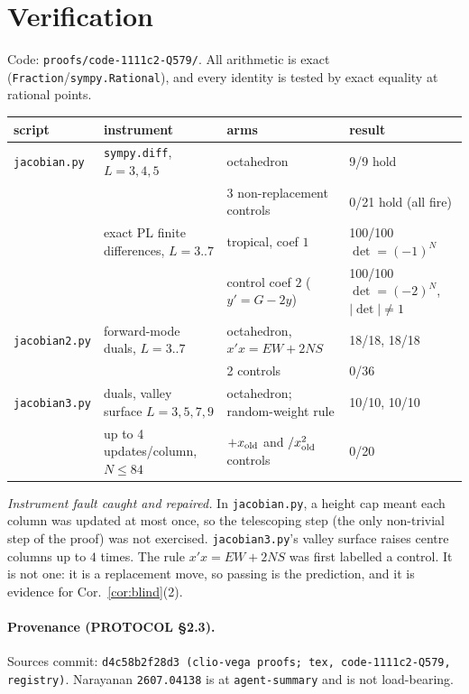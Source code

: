 \documentclass[11pt]{article}
\theoremstyle{definition}
\begin{document}
\section{Verification}\label{sec:ver}
Code: \texttt{proofs/code-1111c2-Q579/}. All arithmetic is exact (\texttt{Fraction}/\texttt{sympy.Rational}), and every identity is tested by exact
equality at rational points.
\begin{center}
\begin{tabular}{llll}
\toprule
script & instrument & arms & result\\
\midrule
\texttt{jacobian.py} & \texttt{sympy.diff}, $L=3,4,5$ & octahedron & 9/9 hold\\
& & 3 non-replacement controls & 0/21 hold (all fire)\\
& exact PL finite differences, $L=3..7$ & tropical, coef $1$ & 100/100 $\det=(-1)^N$\\
& & control coef $2$ ($y'=G-2y$) & 100/100 $\det=(-2)^N$, $|\det|\ne1$\\
\texttt{jacobian2.py} & forward-mode duals, $L=3..7$ & octahedron, $x'x=EW+2NS$ & 18/18, 18/18\\
& & 2 controls & 0/36\\
\texttt{jacobian3.py} & duals, valley surface $L=3,5,7,9$ & octahedron; random-weight rule & 10/10, 10/10\\
& up to 4 updates/column, $N\le84$ & $+x_{\rm old}$ and $/x_{\rm old}^2$ controls & 0/20\\
\bottomrule
\end{tabular}
\end{center}
\noindent\emph{Instrument fault caught and repaired.} In \texttt{jacobian.py}, a height cap meant each
column was updated at most once, so the telescoping step (the only non-trivial step of the proof)
was not exercised. \texttt{jacobian3.py}'s valley surface raises centre columns up to $4$ times. The
rule $x'x=EW+2NS$ was first labelled a control. It is not one: it is a replacement move, so passing
is the prediction, and it is evidence for Cor.~\ref{cor:blind}(2).

\paragraph{Provenance (PROTOCOL \S2.3).} Sources commit: \texttt{d4c58b2f28d3 (clio-vega proofs; tex, code-1111c2-Q579, registry)}.
Narayanan \texttt{2607.04138} is at \texttt{agent-summary} and is not load-bearing.
\end{document}
